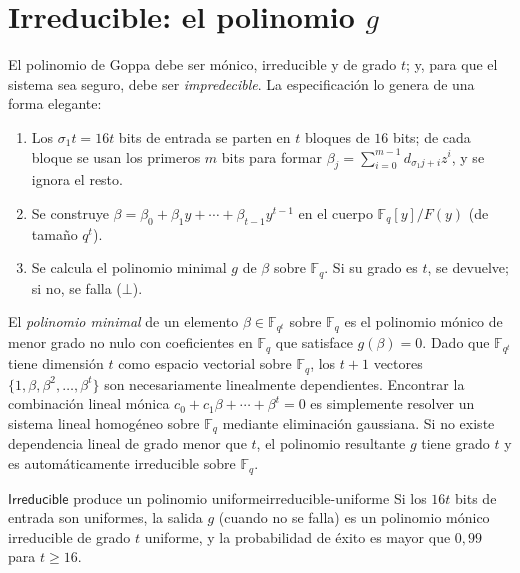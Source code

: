 \documentclass[11pt,a4paper,oneside]{report}
\newcommand{\GF}[1]{\mathbb{F}_{#1}}
\begin{document}
\section{\textsf{Irreducible}: el polinomio $g$}

El polinomio de Goppa debe ser mónico, irreducible y de grado $t$; y,
para que el sistema sea seguro, debe ser \emph{impredecible}. La
especificación lo genera de una forma elegante:

\begin{enumerate}[leftmargin=1.8em,itemsep=2pt]
  \item Los $\sigma_1t=16t$ bits de entrada se parten en $t$ bloques de
        $16$ bits; de cada bloque se usan los primeros $m$ bits para
        formar $\beta_j=\sum_{i=0}^{m-1}d_{\sigma_1 j+i}z^i$, y se
        ignora el resto.
  \item Se construye $\beta=\beta_0+\beta_1y+\cdots+\beta_{t-1}y^{t-1}$
        en el cuerpo $\GF q[y]/F(y)$ (de tamaño $q^t$).
  \item Se calcula el polinomio minimal $g$ de $\beta$ sobre $\GF q$.
        Si su grado es $t$, se devuelve; si no, se falla ($\bot$).
\end{enumerate}

\begin{idea}
El \emph{polinomio minimal} de un elemento $\beta\in\GF{q^t}$ sobre $\GF{q}$ es el
polinomio mónico de menor grado no nulo con coeficientes en $\GF{q}$ que satisface
$g(\beta)=0$. Dado que $\GF{q^t}$ tiene dimensión $t$ como espacio vectorial sobre
$\GF{q}$, los $t+1$ vectores $\{1,\beta,\beta^2,\dots,\beta^t\}$ son necesariamente
linealmente dependientes. Encontrar la combinación lineal mónica
$c_0+c_1\beta+\cdots+\beta^t=0$ es simplemente resolver un sistema lineal homogéneo
sobre $\GF{q}$ mediante eliminación gaussiana. Si no existe dependencia lineal
de grado menor que $t$, el polinomio resultante $g$ tiene grado $t$ y es
automáticamente irreducible sobre $\GF{q}$.
\end{idea}

\begin{proposicion}{$\textsf{Irreducible}$ produce un polinomio uniforme}{irreducible-uniforme}
Si los $16t$ bits de entrada son uniformes, la salida $g$ (cuando no se
falla) es un polinomio mónico irreducible de grado $t$ uniforme, y la
probabilidad de éxito es mayor que $0{,}99$ para $t\ge16$.
\end{proposicion}
\end{document}
